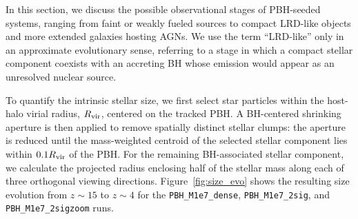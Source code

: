 \documentclass[twocolumn,trackchanges]{aastex701}
\begin{document}


In this section, we discuss the possible observational stages of PBH-seeded systems, ranging from faint or weakly fueled sources to compact LRD-like objects and more extended galaxies hosting AGNs. We use the term ``LRD-like'' only in an approximate evolutionary sense, referring to a stage in which a compact stellar component coexists with an accreting BH whose emission would appear as an unresolved nuclear source. %

To quantify the intrinsic stellar size, we first select star particles within the host-halo virial radius, $R_{\rm vir}$, centered on the tracked PBH. A BH-centered shrinking aperture is then applied to remove spatially distinct stellar clumps: the aperture is reduced until the mass-weighted centroid of the selected stellar component lies within $0.1R_{\rm vir}$ of the PBH. For the remaining BH-associated stellar component, we calculate the projected radius enclosing half of the stellar mass along each of three orthogonal viewing directions. Figure~\ref{fig:size_evo} shows the resulting size evolution from $z\sim15$ to $z\sim4$ for the \texttt{PBH\_M1e7\_dense}, \texttt{PBH\_M1e7\_2sig}, and \texttt{PBH\_M1e7\_2sigzoom} runs. 
\end{document}
